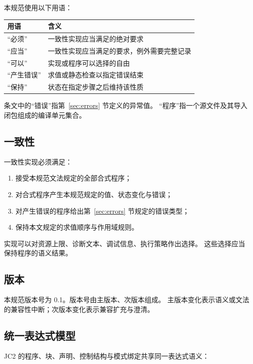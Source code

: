 \documentclass[UTF8,12pt]{ctexart}
\begin{document}
本规范使用以下用语：

\begin{center}
\begin{tabular}{@{}ll@{}}
\toprule
用语 & 含义 \\
\midrule
“必须” & 一致性实现应当满足的绝对要求 \\
“应当” & 一致性实现应当满足的要求，例外需要完整记录 \\
“可以” & 实现或程序可以选择的自由 \\
“产生错误” & 求值或静态检查以指定错误结束 \\
“保持” & 状态在指定步骤之后维持该性质 \\
\bottomrule
\end{tabular}
\end{center}

条文中的“错误”指第~\ref{sec:errors} 节定义的异常值。
“程序”指一个源文件及其导入闭包组成的编译单元集合。

\subsection{一致性}

一致性实现必须满足：

\begin{enumerate}
  \item 接受本规范文法规定的全部合式程序；
  \item 对合式程序产生本规范规定的值、状态变化与错误；
  \item 对产生错误的程序给出第~\ref{sec:errors} 节规定的错误类型；
  \item 保持本文规定的求值顺序与作用域规则。
\end{enumerate}

实现可以对资源上限、诊断文本、调试信息、执行策略作出选择。
这些选择应当保持程序的语义结果。

\subsection{版本}

本规范版本号为 0.1。版本号由主版本、次版本组成。
主版本变化表示语义或文法的兼容性中断；次版本变化表示兼容扩充与澄清。

\subsection{统一表达式模型}

JC2 的程序、块、声明、控制结构与模式绑定共享同一表达式语义：
\end{document}
